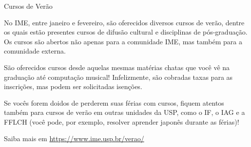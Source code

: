 \begin{secao}{Cursos de Verão}

No IME, entre janeiro e fevereiro, são oferecidos diversos cursos de verão,
dentre os quais estão presentes cursos de difusão cultural e disciplinas de
pós-graduação. Os cursos são abertos não apenas para a comunidade IME, mas
também para a comunidade externa.

São oferecidos cursos desde aquelas mesmas matérias chatas que você vê na 
graduação até computação musical! Infelizmente, são cobradas taxas para as
inscrições, mas podem ser solicitadas isenções.

Se vocês forem doidos de perderem suas férias com cursos, fiquem atentos também 
para cursos de verão em outras unidades da USP, como o IF, o IAG e a FFLCH (você
pode, por exemplo, resolver aprender japonês durante as férias)!

Saiba mais em \url{https://www.ime.usp.br/verao/}

\end{secao}
